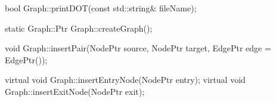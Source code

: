 \begin{apient}
bool Graph::printDOT(const std::string& fileName);
\end{apient}

\begin{apient}
static Graph::Ptr Graph::createGraph();
\end{apient}

\begin{apient}
void Graph::insertPair(NodePtr source, NodePtr target, EdgePtr edge = EdgePtr());
\end{apient}

\begin{apient}
virtual void Graph::insertEntryNode(NodePtr entry);
virtual void Graph::insertExitNode(NodePtr exit);
\end{apient}

